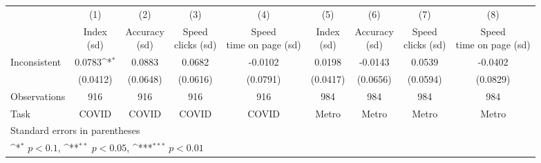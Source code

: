 {
\def\sym#1{\ifmmode^{#1}\else\(^{#1}\)\fi}
\begin{tabular}{l*{8}{c}}
\hline\hline
                    &\multicolumn{1}{c}{(1)}         &\multicolumn{1}{c}{(2)}         &\multicolumn{1}{c}{(3)}         &\multicolumn{1}{c}{(4)}         &\multicolumn{1}{c}{(5)}         &\multicolumn{1}{c}{(6)}         &\multicolumn{1}{c}{(7)}         &\multicolumn{1}{c}{(8)}         \\
                    &\shortstack{Index \\ (sd)}         &\shortstack{Accuracy \\ (sd)}         &\shortstack{Speed \\ clicks (sd)}         &\shortstack{Speed \\ time on page (sd)}         &\shortstack{Index \\ (sd)}         &\shortstack{Accuracy \\ (sd)}         &\shortstack{Speed \\ clicks (sd)}         &\shortstack{Speed \\ time on page (sd)}         \\
\hline
Inconsistent        &      0.0783\sym{*}  &      0.0883         &      0.0682         &     -0.0102         &      0.0198         &     -0.0143         &      0.0539         &     -0.0402         \\
                    &    (0.0412)         &    (0.0648)         &    (0.0616)         &    (0.0791)         &    (0.0417)         &    (0.0656)         &    (0.0594)         &    (0.0829)         \\
\hline
Observations        &         916         &         916         &         916         &         916         &         984         &         984         &         984         &         984         \\
Task                &       COVID         &       COVID         &       COVID         &       COVID         &       Metro         &       Metro         &       Metro         &       Metro         \\
\hline\hline
\multicolumn{9}{l}{\footnotesize Standard errors in parentheses}\\
\multicolumn{9}{l}{\footnotesize \sym{*} \(p<0.1\), \sym{**} \(p<0.05\), \sym{***} \(p<0.01\)}\\
\end{tabular}
}
